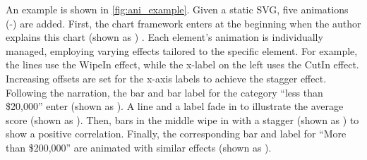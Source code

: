 
An example is shown in \autoref{fig:ani_example}. 
Given a static SVG, five animations (-) are added.
First, the chart framework enters at the beginning when the author explains this chart (shown as ) .
Each element's animation is individually managed, employing varying effects tailored to the specific element.
For example, the lines use the WipeIn effect, while the x-label on the left uses the CutIn effect. 
Increasing offsets are set for the x-axis labels to achieve the stagger effect.
Following the narration, the bar and bar label for the category ``less than \$20,000'' enter (shown as ).
A line and a label fade in to illustrate the average score (shown as ).
Then, bars in the middle wipe in with a stagger (shown as ) to show a positive correlation.
Finally, the corresponding bar and label for ``More than \$200,000'' are animated with similar effects (shown as ).


